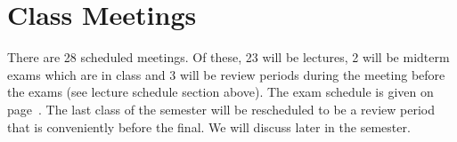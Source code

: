 
\section*{Class Meetings}

There are 28 scheduled meetings. Of these, 23 will be lectures, 2 will be midterm exams which are in class and 3 will be review periods during the meeting before the exams (see lecture schedule section above). The exam schedule is given on page~\pageref{subsec:exam_schedule}. The last class of the semester will be rescheduled to be a review period that is conveniently before the final. We will discuss later in the semester. %